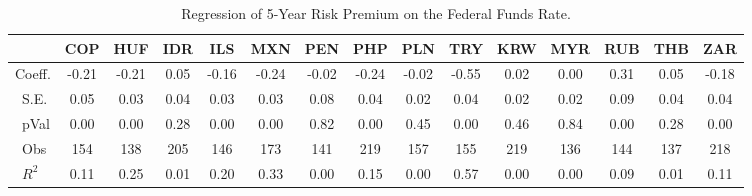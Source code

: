 \begin{table}
	\centering
\begin{tabular}{l|cccccccccccccc}
\toprule
&\textbf{COP}&\textbf{HUF}&\textbf{IDR}&\textbf{ILS}&\textbf{MXN}&\textbf{PEN}&\textbf{PHP}&\textbf{PLN}&\textbf{TRY}&\textbf{KRW}&\textbf{MYR}&\textbf{RUB}&\textbf{THB}&\textbf{ZAR}\\\midrule
{ Coeff.}&-0.21&-0.21&0.05&-0.16&-0.24&-0.02&-0.24&-0.02&-0.55&0.02&0.00&0.31&0.05&-0.18\\\
{S.E.}&0.05&0.03&0.04&0.03&0.03&0.08&0.04&0.02&0.04&0.02&0.02&0.09&0.04&0.04\\\
{pVal}&0.00&0.00&0.28&0.00&0.00&0.82&0.00&0.45&0.00&0.46&0.84&0.00&0.28&0.00\\\
{Obs}&154&138&205&146&173&141&219&157&155&219&136&144&137&218\\\
{$R^2$}&0.11&0.25&0.01&0.20&0.33&0.00&0.15&0.00&0.57&0.00&0.00&0.09&0.01&0.11\\ \bottomrule
\end{tabular}
\\
\caption{Regression of 5-Year Risk Premium on the Federal Funds Rate.}
\label{tab:rp_reg_ffr}
\end{table}